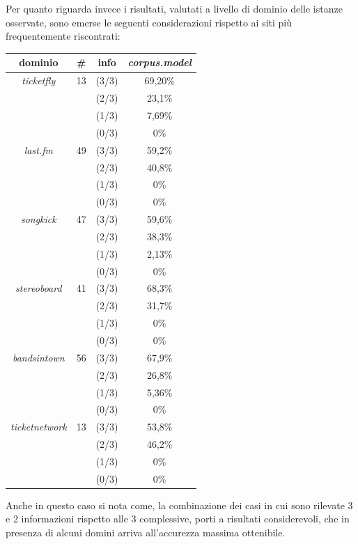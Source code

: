 \documentclass[a4paper]{report}
\begin{document}
\\ \\
Per quanto riguarda invece i risultati, valutati a livello di dominio delle istanze osservate, sono emerse le seguenti considerazioni rispetto ai siti più frequentemente riscontrati:
\begin{center}
\begin{tabular}{|cccc|}
\hline
dominio & \# & info & \textit{corpus.model} \\
\hline
\textit{ticketfly} &13& (3/3) & 69,20\%\\
& & (2/3) & 23,1\%\\
& & (1/3) & 7,69\%\\
& & (0/3) & 0\%\\
\hline
\textit{last.fm} &49& (3/3) & 59,2\%\\
& & (2/3) & 40,8\%\\
& & (1/3) & 0\%\\
& & (0/3) & 0\%\\
\hline
\textit{songkick}  &47& (3/3) & 59,6\%\\
& & (2/3) & 38,3\%\\
& & (1/3) & 2,13\%\\
& & (0/3) & 0\%\\
\hline
\textit{stereoboard}  &41& (3/3) & 68,3\%\\
& & (2/3) & 31,7\%\\
& & (1/3) & 0\%\\
& & (0/3) & 0\%\\
\hline
\textit{bandsintown} &56& (3/3) & 67,9\%\\
& & (2/3) & 26,8\%\\
& & (1/3) & 5,36\%\\
& & (0/3) & 0\%\\
\hline
\textit{ticketnetwork} &13& (3/3) & 53,8\%\\
& & (2/3) & 46,2\%\\
& & (1/3) & 0\%\\
& & (0/3) & 0\%\\
\hline
\end{tabular}
\end{center}
Anche in questo caso si nota come, la combinazione dei casi in cui sono rilevate 3 e 2 informazioni rispetto alle 3 complessive, porti a risultati considerevoli, che in presenza di alcuni domini arriva all'accurezza massima ottenibile.
\cleardoublepage
\renewcommand\bibname{Riferimenti}
\end{document}
